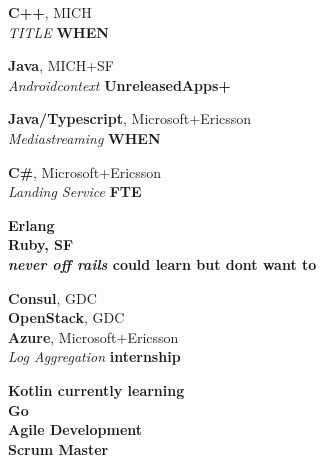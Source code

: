 \documentclass[margin,line]{res}
\begin{document}
\begin{resume}
{\bf C++}, MICH\\
{\em TITLE} \hfill {\bf  WHEN}

{\bf Java}, MICH+SF\\
{\em Androidcontext} \hfill {\bf UnreleasedApps+ }

{\bf Java/Typescript}, Microsoft+Ericsson\\
{\em Mediastreaming } \hfill {\bf WHEN}

{\bf {C\#}}, Microsoft+Ericsson\\
{\em Landing Service} \hfill {\bf  FTE}

\bf Erlang\\

{\bf Ruby}, SF\\
{\em never off rails} \hfill could learn but dont want to

{\bf Consul}, GDC\\
{\bf OpenStack}, GDC\\

{\bf Azure}, Microsoft+Ericsson\\
{\em Log Aggregation} \hfill {\bf internship}

{\bf Kotlin currently learning}\\
{\bf Go}\\

\bf Agile Development\\
\bf Scrum Master\\


\end{resume}
\end{document}
